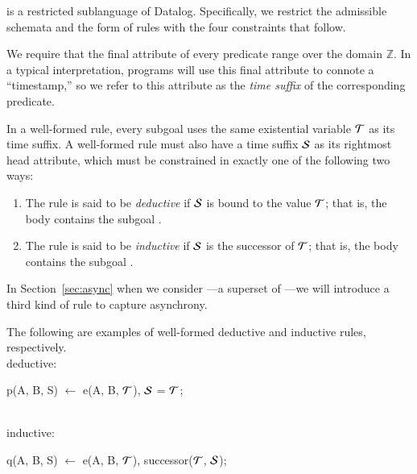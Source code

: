 \slang is a restricted sublanguage of Datalog.  Specifically, we restrict the
admissible schemata and the form of rules with the four constraints that follow.

We require that the final attribute of every \slang
predicate range over the domain $\mathbb{Z}$.  In a typical
interpretation, \slang programs will use this final attribute to connote a
``timestamp,'' so we refer to this attribute as the \emph{time suffix} of the
corresponding predicate.

%
%
In a well-formed \slang rule, every subgoal uses the same existential variable $\Tau$
as its time suffix.  A well-formed
\slang rule must also have a time suffix $\SDedalus$ as its rightmost head attribute, which must be
constrained in exactly one of the following two ways:
\begin{enumerate}
%
\item The rule is said to be \emph{deductive} if $\SDedalus$ is bound to the
value $\Tau$; that is, the body contains the subgoal \dedalus{$\SDedalus$ = $\Tau$}.
%
\item The rule is said to be {\em inductive} if $\SDedalus$ is the successor of
$\Tau$; that is, the body contains the subgoal .
%
\end{enumerate}

In Section~\ref{sec:async} when we consider \lang---a superset of \slang---we will
introduce a third kind of rule to capture asynchrony.

\begin{example}
The following are examples of well-formed deductive and inductive rules, respectively.
\\
deductive:
\begin{Dedalus}
p(A, B, S) \(\leftarrow\) e(A, B, \(\Tau\)), \(\SDedalus\) = \(\Tau\);
\end{Dedalus}
\\
inductive:
\begin{Dedalus}
q(A, B, S) \(\leftarrow\) e(A, B, \(\Tau\)), successor(\(\Tau\), \(\SDedalus\));
\end{Dedalus}
\end{example}

